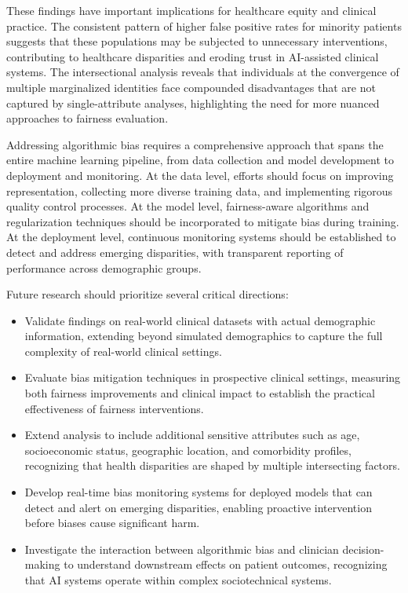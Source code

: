 These findings have important implications for healthcare equity and 
clinical practice. The consistent pattern of higher false positive rates 
for minority patients suggests that these populations may be subjected to 
unnecessary interventions, contributing to healthcare disparities and 
eroding trust in AI-assisted clinical systems. The intersectional analysis 
reveals that individuals at the convergence of multiple marginalized 
identities face compounded disadvantages that are not captured by 
single-attribute analyses, highlighting the need for more nuanced approaches 
to fairness evaluation.

Addressing algorithmic bias requires a comprehensive approach that spans 
the entire machine learning pipeline, from data collection and model 
development to deployment and monitoring. At the data level, efforts should 
focus on improving representation, collecting more diverse training data, 
and implementing rigorous quality control processes. At the model level, 
fairness-aware algorithms and regularization techniques should be incorporated 
to mitigate bias during training. At the deployment level, continuous 
monitoring systems should be established to detect and address emerging 
disparities, with transparent reporting of performance across demographic 
groups.

Future research should prioritize several critical directions:

\begin{itemize}[leftmargin=*]
    \item Validate findings on real-world clinical datasets with actual 
          demographic information, extending beyond simulated demographics 
          to capture the full complexity of real-world clinical settings.
    \item Evaluate bias mitigation techniques in prospective clinical 
          settings, measuring both fairness improvements and clinical impact 
          to establish the practical effectiveness of fairness interventions.
    \item Extend analysis to include additional sensitive attributes such 
          as age, socioeconomic status, geographic location, and comorbidity 
          profiles, recognizing that health disparities are shaped by 
          multiple intersecting factors.
    \item Develop real-time bias monitoring systems for deployed models 
          that can detect and alert on emerging disparities, enabling 
          proactive intervention before biases cause significant harm.
    \item Investigate the interaction between algorithmic bias and clinician 
          decision-making to understand downstream effects on patient 
          outcomes, recognizing that AI systems operate within complex 
          sociotechnical systems.
\end{itemize}

